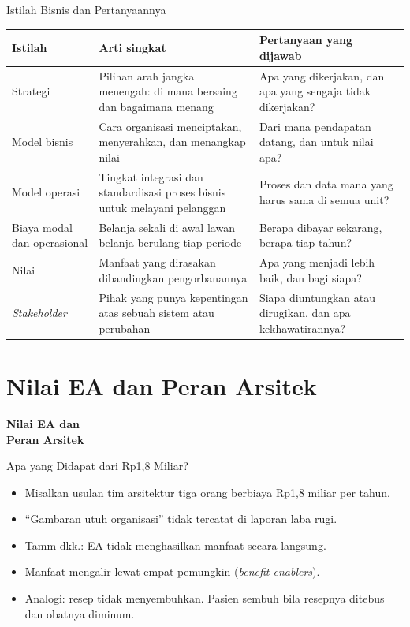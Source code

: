 \documentclass[aspectratio=169, table, 12pt]{beamer}
\begin{document}
\begin{frame}{{\Large Istilah Bisnis dan Pertanyaannya}}
  \scriptsize
  \begin{tabularx}{\textwidth}{>{\raggedright\arraybackslash}p{1.8cm}
      >{\raggedright\arraybackslash}X >{\raggedright\arraybackslash}X}
    \hline
    \textbf{Istilah} & \textbf{Arti singkat} & \textbf{Pertanyaan yang dijawab} \\
    \hline
    Strategi & Pilihan arah jangka menengah: di mana bersaing dan bagaimana menang & Apa yang dikerjakan, dan apa yang sengaja tidak dikerjakan? \\
    \hline
    Model bisnis & Cara organisasi menciptakan, menyerahkan, dan menangkap nilai & Dari mana pendapatan datang, dan untuk nilai apa? \\
    \hline
    Model operasi & Tingkat integrasi dan standardisasi proses bisnis untuk melayani pelanggan & Proses dan data mana yang harus sama di semua unit? \\
    \hline
    Biaya modal dan operasional & Belanja sekali di awal lawan belanja berulang tiap periode & Berapa dibayar sekarang, berapa tiap tahun? \\
    \hline
    Nilai & Manfaat yang dirasakan dibandingkan pengorbanannya & Apa yang menjadi lebih baik, dan bagi siapa? \\
    \hline
    \textit{Stakeholder} & Pihak yang punya kepentingan atas sebuah sistem atau perubahan & Siapa diuntungkan atau dirugikan, dan apa kekhawatirannya? \\
    \hline
  \end{tabularx}
\end{frame}

\section{Nilai EA dan Peran Arsitek}

\begin{frame}{\hfill}
  \centering
  \Huge{\textbf{Nilai EA dan\\Peran Arsitek}}
\end{frame}

\begin{frame}{{\Large Apa yang Didapat dari Rp1,8 Miliar?}}
  \vspace{10pt}
  \begin{itemize}
    \item Misalkan usulan tim arsitektur tiga orang berbiaya Rp1,8 miliar per tahun.
    \item ``Gambaran utuh organisasi'' tidak tercatat di laporan laba rugi.
    \item Tamm dkk.: EA tidak menghasilkan manfaat secara langsung.
    \item Manfaat mengalir lewat empat pemungkin (\textit{benefit enablers}).
    \item Analogi: resep tidak menyembuhkan. Pasien sembuh bila resepnya ditebus dan obatnya diminum.
  \end{itemize}
\end{frame}
\end{document}
